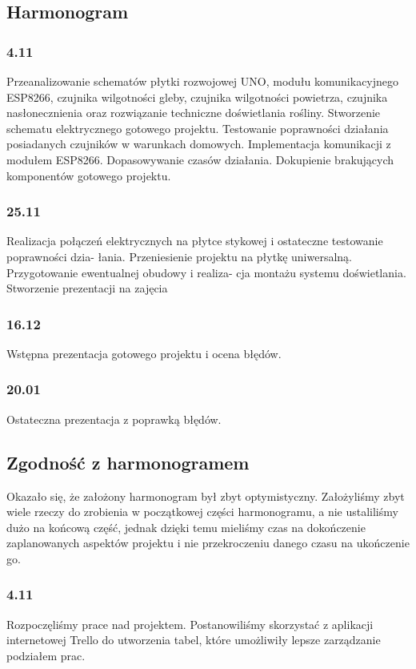 \documentclass[12pt]{article}
\begin{document}
\newpage
\subsection{Harmonogram}
\subsubsection{4.11}
Przeanalizowanie schematów płytki rozwojowej UNO, modułu komunikacyjnego ESP8266, czujnika wilgotności gleby, czujnika wilgotności powietrza, czujnika nasłonecznienia oraz rozwiązanie techniczne doświetlania rośliny. Stworzenie schematu elektrycznego gotowego projektu. Testowanie poprawności działania posiadanych czujników w warunkach domowych. Implementacja komunikacji z modułem ESP8266. Dopasowywanie czasów działania. 
Dokupienie brakujących komponentów gotowego projektu. 
\subsubsection{25.11}
Realizacja połączeń elektrycznych na płytce stykowej i ostateczne testowanie poprawności dzia-
łania. Przeniesienie projektu na płytkę uniwersalną. Przygotowanie ewentualnej obudowy i realiza-
cja montażu systemu doświetlania. Stworzenie prezentacji na zajęcia

\subsubsection{16.12}
Wstępna prezentacja gotowego projektu i ocena błędów.

\subsubsection{20.01}
Ostateczna prezentacja z poprawką błędów.

\newpage

\subsection{Zgodność z harmonogramem}
Okazało się, że założony harmonogram był zbyt optymistyczny. Założyliśmy zbyt wiele rzeczy do zrobienia w początkowej części harmonogramu, a nie ustaliliśmy dużo na końcową część, jednak dzięki temu mieliśmy czas na dokończenie zaplanowanych aspektów projektu i nie przekroczeniu danego czasu na ukończenie go.

\subsubsection{4.11}
Rozpoczęliśmy prace nad projektem. Postanowiliśmy skorzystać z aplikacji internetowej Trello do utworzenia tabel, które umożliwiły lepsze zarządzanie podziałem prac.
\end{document}
